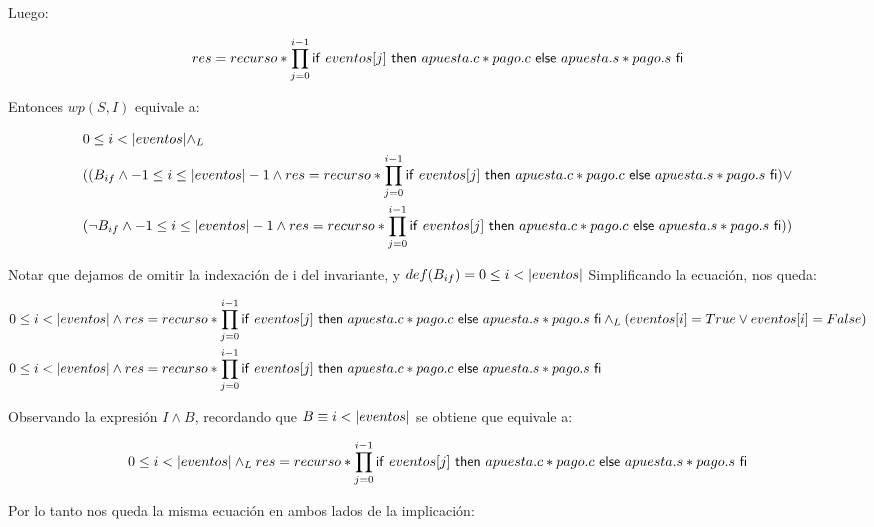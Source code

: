 \documentclass[10pt,a4paper]{article}
\begin{document}
 Luego:

\begin{equation}
	res = recurso * \prod\limits_{j=0}^{i-1} \mathsf{if}\ eventos[j]\ \mathsf{then}\ apuesta.c * pago.c\ \mathsf{else}\ apuesta.s * pago.s\ \mathsf{fi}
\end{equation}

 Entonces $wp(S,I)$ equivale a:

\begin{equation}
\begin{split}
	& 0 \leq i < \longitud{eventos} \yLuego\\
	& (( B_{if} \land -1 \leq i \leq \longitud{eventos} - 1 \land res = recurso * \prod\limits_{j=0}^{i-1} \IfThenElse{eventos[j]}{apuesta.c * pago.c}{apuesta.s * pago.s} ) \lor\\

	& ( \neg B_{if} \land -1 \leq i \leq \longitud{eventos} - 1 \land res = recurso * \prod\limits_{j=0}^{i-1} \IfThenElse{eventos[j]}{apuesta.c * pago.c}{apuesta.s * pago.s} ))
\end{split}
\end{equation}
 
 Notar que dejamos de omitir la indexación de i del invariante, y $def(B_{if}) = 0 \leq i < |eventos|$
 Simplificando la ecuación, nos queda:

\begin{equation}
\begin{split}
	& 0 \leq i < \longitud{eventos} \land res = recurso * \prod\limits_{j=0}^{i-1} \IfThenElse{eventos[j]}{apuesta.c * pago.c}{apuesta.s * pago.s} \yLuego (eventos[i] = True \lor eventos[i] = False)\\

	& 0 \leq i < \longitud{eventos} \land res = recurso * \prod\limits_{j=0}^{i-1} \IfThenElse{eventos[j]}{apuesta.c * pago.c}{apuesta.s * pago.s}
\end{split}
\end{equation}

 Observando la expresión $I \land B$, recordando que $B \equiv i < |eventos|$ se obtiene que equivale a:

\begin{equation}
	0 \leq i < |eventos| \land _L res = recurso * \prod\limits_{j=0}^{i-1} \mathsf{if}\ eventos[j]\ \mathsf{then}\ apuesta.c * pago.c\ \mathsf{else}\ apuesta.s * pago.s\ \mathsf{fi}
\end{equation}

 Por lo tanto nos queda la misma ecuación en ambos lados de la implicación:
\end{document}
